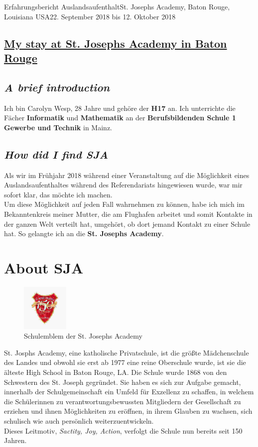 \documentclass[oneside,openany,headings=optiontotoc,11pt,numbers=noenddot]{article}
\begin{document}
				
	\begin{worksheet}{Erfahrungsbericht Auslandsaufenthalt}{St. Joseph\grq{}s Academy, Baton Rouge, Louisiana USA}{22. September 2018 bis 12. Oktober 2018}
		\begin{center}
			\section*{\underline{My stay at St. Joseph\grq{}s Academy in Baton Rouge}}
		\end{center}
		\setcounter{section}{1}
		\subsection*{\textit{A brief introduction}}
		Ich bin Carolyn Wesp, 28 Jahre und gehöre der \textbf{H17} an. Ich unterrichte die Fächer \textbf{Informatik} und \textbf{Mathematik} an der \textbf{Berufsbildenden Schule 1 Gewerbe und Technik} in Mainz.
		\subsection*{\textit{How did I find SJA}}
		Als wir im Frühjahr 2018 während einer Veranstaltung auf die Möglichkeit eines Auslandsaufenthaltes während des Referendariats hingewiesen wurde, war mir sofort klar, das möchte ich machen.\\
		Um diese Möglichkeit auf jeden Fall wahrnehmen zu können, habe ich mich im Bekanntenkreis meiner Mutter, die am Flughafen arbeitet und somit Kontakte in der ganzen Welt verteilt hat, umgehört, ob dort jemand Kontakt zu einer Schule hat. So gelangte ich an die \textbf{St. Joseph\grq{}s Academy}.
		\setcounter{section}{0}
		\section{About SJA}
		\begin{figure}
			\centering
			\includegraphics[width=0.2\textwidth]{../99_Bilder/SJA.jpg}
			\caption{\label{fig:sja}Schulemblem der St. Joseph\grq{}s Academy}
		\end{figure}
		St. Josph\grq{}s Academy, eine katholische Privatschule, ist die größte Mädchenschule des Landes und obwohl sie erst ab 1977 eine reine Oberschule wurde, ist sie die älteste High School in Baton Rouge, LA. Die Schule wurde 1868 von den Schwestern des St. Joseph gegründet. Sie haben es sich zur Aufgabe gemacht, innerhalb der Schulgemeinschaft ein Umfeld für Exzellenz zu schaffen, in welchem die Schülerinnen zu verantwortungsbewussten Mitgliedern der Gesellschaft zu erziehen und ihnen Möglichkeiten zu eröffnen, in ihrem Glauben zu wachsen, sich schulisch wie auch persönlich weiterzuentwickeln.\\
		Dieses Leitmotiv, \textit{Sactity, Joy, Action}, verfolgt die Schule nun bereits seit 150 Jahren.\\

\end{worksheet}
\end{document}
